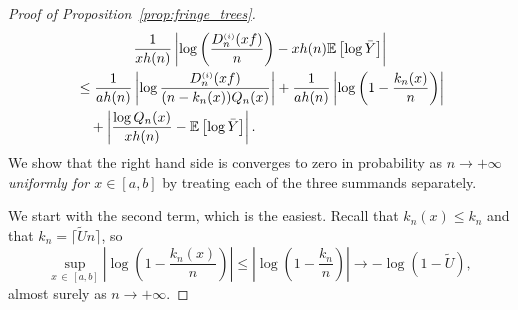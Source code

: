 \documentclass[10pt]{amsart}
\theoremstyle{definition}\newtheorem{defi}[theo]{Definition}\newtheorem{rema}[theo]{Remark}\newtheorem{exam}[theo]{Example}\newtheorem{exem}[theo]{Example}\newtheorem{nota}[theo]{Notation}
\newcommand{\sss}{\ensuremath{\scriptscriptstyle}}
\newcommand{\bbE}{\mathbb{E}}
\begin{document}
\begin{proof}[Proof of Proposition~\ref{prop:fringe_trees}]
\begin{multline}\label{eq:three_terms}
\frac1{xh(n)}\left|\log \left(\frac{D_n^{\sss (i)}(xf)}n\right)-xh(n)\bbE\left[\log \bar Y\right]\right|
\\
\begin{aligned}
&\leq \frac1{ah(n)}\left|\log \frac{D_n^{\sss (i)}(xf)}{(n-k_n(x))Q_n(x)}\right| +\frac1{ah(n)}\left|\log\left(1-\frac{k_n(x)}n\right)\right|\\
&\quad+\left|\frac{\log Q_n(x)}{xh(n)}-\bbE\left[\log \bar Y\right]\right|.
\end{aligned}
\end{multline}
We show that the right hand side is converges to zero in probability as $n\to+\infty$ \emph{uniformly for $x\in[a,b]$} by treating each of the three summands separately.

We start with the second term, which is the easiest. Recall that $k_n(x)\leq k_n$ and that $k_n = \lceil \widetilde Un\rceil$, so
\begin{equation}\label{eq:1st}
\sup_{x\,\in\,[a,b]}\left|\log\left(1-\frac{k_n(x)}n\right)\right| \leq \left|\log\left(1-\frac{k_n}n\right)\right|
\to -\log (1-\widetilde U),
\end{equation}
almost surely as $n\to+\infty$.


\end{proof}
\end{document}
